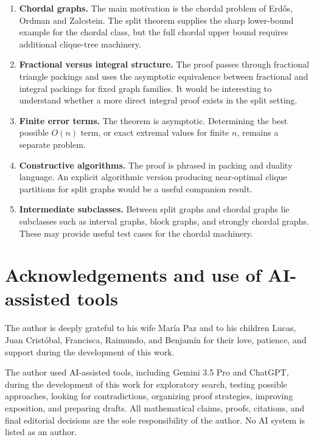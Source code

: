 \documentclass[11pt]{article}
\begin{document}
\begin{enumerate}[label=(\roman*)]
    \item \textbf{Chordal graphs.} The main motivation is the chordal problem of Erdős, Ordman and Zalcstein. The split theorem supplies the sharp lower-bound example for the chordal class, but the full chordal upper bound requires additional clique-tree machinery.
    \item \textbf{Fractional versus integral structure.} The proof passes through fractional triangle packings and uses the asymptotic equivalence between fractional and integral packings for fixed graph families. It would be interesting to understand whether a more direct integral proof exists in the split setting.
    \item \textbf{Finite error terms.} The theorem is asymptotic. Determining the best possible \(O(n)\) term, or exact extremal values for finite \(n\), remains a separate problem.
    \item \textbf{Constructive algorithms.} The proof is phrased in packing and duality language. An explicit algorithmic version producing near-optimal clique partitions for split graphs would be a useful companion result.
    \item \textbf{Intermediate subclasses.} Between split graphs and chordal graphs lie subclasses such as interval graphs, block graphs, and strongly chordal graphs. These may provide useful test cases for the chordal machinery.
\end{enumerate}

\section*{Acknowledgements and use of AI-assisted tools}

The author is deeply grateful to his wife María Paz and to his children Lucas, Juan Cristóbal, Francisca, Raimundo, and Benjamín for their love, patience, and support during the development of this work.

The author used AI-assisted tools, including Gemini 3.5 Pro and ChatGPT, during the development of this work for exploratory search, testing possible approaches, looking for contradictions, organizing proof strategies, improving exposition, and preparing drafts. All mathematical claims, proofs, citations, and final editorial decisions are the sole responsibility of the author. No AI system is listed as an author.
\end{document}
